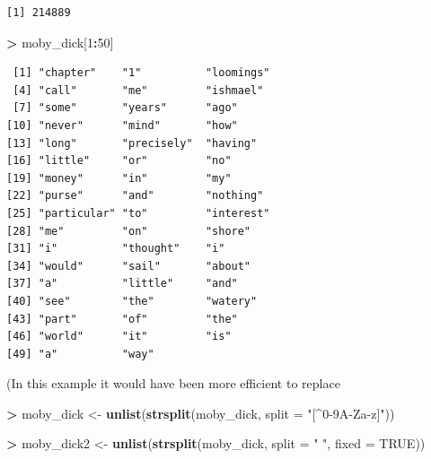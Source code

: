 \documentclass[
]{krantz}
\makeatletter
\newenvironment{Shaded}{\begin{snugshade}}{\end{snugshade}}
\newcommand{\DataTypeTok}[1]{\textcolor[rgb]{0.27,0.27,0.27}{#1}}
\newcommand{\DecValTok}[1]{\textcolor[rgb]{0.06,0.06,0.06}{#1}}
\newcommand{\KeywordTok}[1]{\textcolor[rgb]{0.27,0.27,0.27}{\textbf{#1}}}
\newcommand{\NormalTok}[1]{#1}
\newcommand{\OperatorTok}[1]{\textcolor[rgb]{0.43,0.43,0.43}{\textbf{#1}}}
\newcommand{\OtherTok}[1]{\textcolor[rgb]{0.37,0.37,0.37}{#1}}
\newcommand{\StringTok}[1]{\textcolor[rgb]{0.5,0.5,0.5}{#1}}
\newenvironment{kframe}{%
\medskip{}
\setlength{\fboxsep}{.8em}
 \def\at@end@of@kframe{}%
 \ifinner\ifhmode%
  \def\at@end@of@kframe{\end{minipage}}%
  \begin{minipage}{\columnwidth}%
 \fi\fi%
 \def\FrameCommand##1{\hskip\@totalleftmargin \hskip-\fboxsep
 \colorbox{shadecolor}{##1}\hskip-\fboxsep
     \hskip-\linewidth \hskip-\@totalleftmargin \hskip\columnwidth}%
 \MakeFramed {\advance\hsize-\width
   \@totalleftmargin\z@ \linewidth\hsize
   \@setminipage}}%
 {\par\unskip\endMakeFramed%
 \at@end@of@kframe}
\renewenvironment{Shaded}{\begin{kframe}}{\end{kframe}}
\makeatother
\begin{document}
\begin{verbatim}
[1] 214889
\end{verbatim}

\begin{Shaded}
\begin{Highlighting}[]
\OperatorTok{\textgreater{}}\StringTok{ }\NormalTok{moby\_dick[}\DecValTok{1}\OperatorTok{:}\DecValTok{50}\NormalTok{]}
\end{Highlighting}
\end{Shaded}

\begin{verbatim}
 [1] "chapter"    "1"          "loomings"  
 [4] "call"       "me"         "ishmael"   
 [7] "some"       "years"      "ago"       
[10] "never"      "mind"       "how"       
[13] "long"       "precisely"  "having"    
[16] "little"     "or"         "no"        
[19] "money"      "in"         "my"        
[22] "purse"      "and"        "nothing"   
[25] "particular" "to"         "interest"  
[28] "me"         "on"         "shore"     
[31] "i"          "thought"    "i"         
[34] "would"      "sail"       "about"     
[37] "a"          "little"     "and"       
[40] "see"        "the"        "watery"    
[43] "part"       "of"         "the"       
[46] "world"      "it"         "is"        
[49] "a"          "way"       
\end{verbatim}

(In this example it would have been more efficient to replace

\begin{Shaded}
\begin{Highlighting}[]
\OperatorTok{\textgreater{}}\StringTok{ }\NormalTok{moby\_dick \textless{}{-}}\StringTok{ }\KeywordTok{unlist}\NormalTok{(}\KeywordTok{strsplit}\NormalTok{(moby\_dick, }\DataTypeTok{split =} \StringTok{"[\^{}0{-}9A{-}Za{-}z]"}\NormalTok{))}
\end{Highlighting}
\end{Shaded}

\begin{Shaded}
\begin{Highlighting}[]
\OperatorTok{\textgreater{}}\StringTok{ }\NormalTok{moby\_dick2 \textless{}{-}}\StringTok{ }\KeywordTok{unlist}\NormalTok{(}\KeywordTok{strsplit}\NormalTok{(moby\_dick, }\DataTypeTok{split =} \StringTok{" "}\NormalTok{, }\DataTypeTok{fixed =} \OtherTok{TRUE}\NormalTok{))}
\end{Highlighting}
\end{Shaded}
\end{document}
